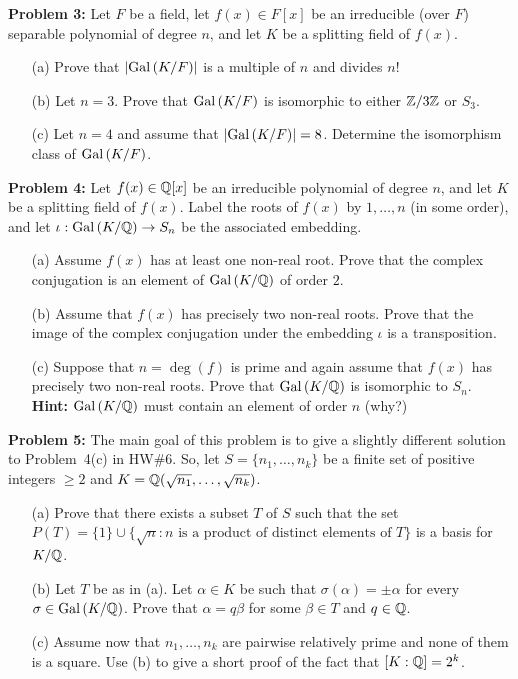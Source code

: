 \documentclass[12pt]{article}
\begin{document}
{\bf Problem 3:} \rm Let $F$ be a field, let $f(x)\in F[x]$
be an irreducible (over $F$) separable polynomial of degree $n$,
and let $K$ be a splitting field of $f(x)$.

\begin{itemize}
\item[(a)] Prove that $|{\rm Gal\,}(K/F)|$ is a multiple of $n$ and divides $n!$

\item[(b)] Let $n=3$. Prove that ${\rm Gal\,}(K/F)$ is isomorphic to either ${\mathbb Z}/3{\mathbb Z}$ or $S_3$.

\item[(c)] Let $n=4$ and assume that $|{\rm Gal\,}(K/F)|=8$.
Determine the isomorphism class of ${\rm Gal\,}(K/F)$.
\end{itemize}


{\bf Problem 4:} Let $f(x)\in {\mathbb Q}[x]$ be an irreducible polynomial
of degree $n$, and let $K$ be a splitting field of $f(x)$.
Label the roots of $f(x)$ by $1,\ldots, n$ (in some order),
and let $\iota: {\rm Gal\,}(K/{\mathbb Q})\to S_n$ be the associated embedding.

\begin{itemize}
\item[(a)] Assume $f(x)$ has at least one non-real root. Prove
that the complex conjugation is an element of ${\rm Gal\,}(K/{\mathbb Q})$
of order $2$.

\item[(b)] Assume that $f(x)$ has precisely two non-real roots. Prove
that the image of the complex conjugation under the embedding $\iota$
is a transposition.

\item[(c)] Suppose that $n=\deg(f)$ is prime and again assume that $f(x)$ has precisely
two non-real roots. Prove that ${\rm Gal\,}(K/{\mathbb Q})$ is isomorphic to $S_n$.
{\bf Hint:} ${\rm Gal\,}(K/{\mathbb Q})$ must contain an element of order $n$ (why?)

\end{itemize}
{\bf Problem 5:} The main goal of this problem is to give a slightly different solution
to Problem~4(c) in HW\#6. So, let $S=\{n_1,\ldots, n_k\}$ be a finite set of positive integers $\geq 2$ and $K={\mathbb Q}(\sqrt{n_1},\ldots, \sqrt{n_k})$.

\begin{itemize}
\item[(a)] Prove that there exists a subset $T$ of $S$ such that the set
$P(T)=\{1\}\cup \{\sqrt{n} : n \mbox{ is a product of distinct elements of }T\}$
is a basis for $K/{\mathbb Q}$.

\item[(b)] Let $T$ be as in (a). Let $\alpha\in K$ be such that $\sigma(\alpha)=\pm \alpha$ for every $\sigma\in {\rm Gal\,}(K/{\mathbb Q})$. Prove that $\alpha=q\beta$ for some $\beta\in T$ and $q\in{\mathbb Q}$.

\item[(c)] Assume now that $n_1,\ldots, n_k$ are pairwise relatively prime and none
of them is a square. Use (b) to give a short proof of the fact that $[K:{\mathbb Q}]=2^k$. 
\end{itemize}
\end{document}
